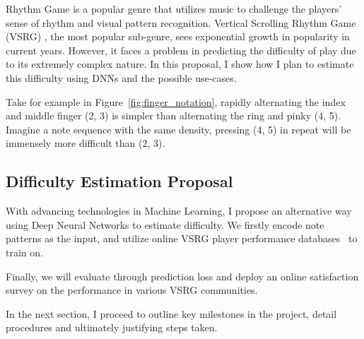 Rhythm Game is a popular genre that utilizes music to challenge the players' sense of rhythm and visual pattern recognition.
Vertical Scrolling Rhythm Game (VSRG) , the most popular sub-genre, sees exponential growth in popularity in current years.
However, it faces a problem in predicting the difficulty of play due to its extremely complex nature.
In this proposal, I show how I plan to estimate this difficulty using DNNs and the possible use-cases.


Take for example in Figure~\ref{fig:finger_notation}, rapidly alternating the index and middle finger (2, 3) is simpler than alternating the ring and pinky (4, 5).
Imagine a note sequence with the same density, pressing (4, 5) in repeat will be immensely more difficult than (2, 3).

\subsection{Difficulty Estimation Proposal}\label{subsec:difficulty-estimation-proposal}

With advancing technologies in Machine Learning, I propose an alternative way using Deep Neural Networks to estimate difficulty.
We firstly encode note patterns as the input, and utilize online VSRG player performance databases~\cite{osu,quaver,etterna} to train on.

Finally, we will evaluate through prediction loss and deploy an online satisfaction survey on the performance in various VSRG communities.

In the next section, I proceed to outline key milestones in the project, detail procedures and ultimately justifying steps taken.
